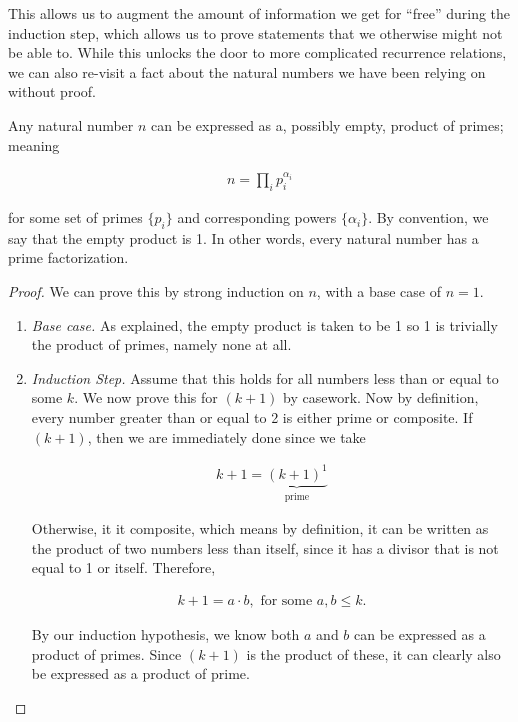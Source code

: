 \documentclass[twoside]{report}
\begin{document}
This allows us to augment the amount of information we get for ``free'' during the induction step, which allows us to prove statements that we otherwise might not be able to. While this unlocks the door to more complicated recurrence relations, we can also re-visit a fact about the natural numbers we have been relying on without proof.

\vspace{\baselineskip}
\begin{theorem}
	Any natural number $n$ can be expressed as a, possibly empty, product of primes; meaning
	
	\begin{align*}
		n = \prod_{i} p_i^{\alpha_i}
	\end{align*}
	
	for some set of primes $\{ p_i \}$ and corresponding powers $\{ \alpha_i \}$. By convention, we say that the empty product is 1. In other words, every natural number has a prime factorization.
\end{theorem}
\begin{proof}
	We can prove this by strong induction on $n$, with a base case of $n = 1$.
	
	\vspace{\baselineskip}
	\begin{enumerate}
		\item \emph{Base case.} As explained, the empty product is taken to be 1 so 1 is trivially the product of primes, namely none at all.
		
		\item \emph{Induction Step.} Assume that this holds for all numbers less than or equal to some $k$. We now prove this for $(k + 1)$ by casework. Now by definition, every number greater than or equal to 2 is either prime or composite. If $(k + 1)$, then we are immediately done since we take
		
		\begin{align*}
			k + 1 = \underbrace{(k + 1)^1}_\text{prime}
		\end{align*}
		
		Otherwise, it it composite, which means by definition, it can be written as the product of two numbers less than itself, since it has a divisor that is not equal to 1 or itself. Therefore,
		
		\begin{align*}
			k + 1 = a \cdot b, \text{ for some } a, b \le k.
		\end{align*}
		
		By our induction hypothesis, we know both $a$ and $b$ can be expressed as a product of primes. Since $(k + 1)$ is the product of these, it can clearly also be expressed as a product of prime.
	\end{enumerate}
\end{proof}
\vspace{\baselineskip}
\end{document}
